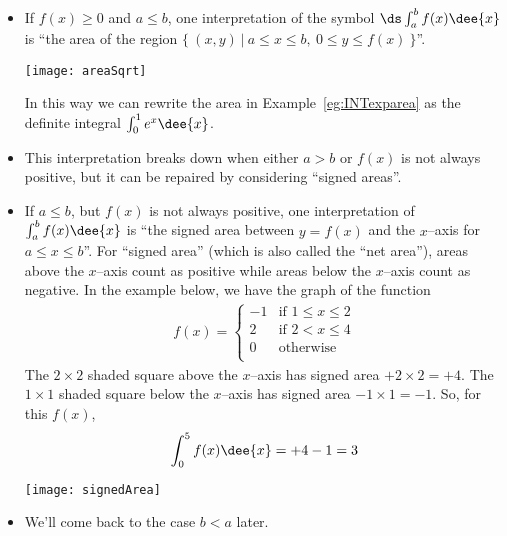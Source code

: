 \begin{itemize}
\item If $f(x)\ge 0$ and $a\le b$, one interpretation of the symbol
       $\ds \int_a^b f(x)\dee{x}$ is ``the area of the region $\big\{\ (x,y)\ \big|\
                                 a\le x\le b,\   0\le y\le f(x)\ \big\}$''.
      \begin{efig}
      \begin{center}
          \texttt{[image: areaSqrt]}
      \end{center}
      \end{efig}
In this way we can rewrite the area in Example~\ref{eg:INTexparea} as the definite
integral $\int_0^1 e^x \dee{x}$.

\item This interpretation breaks down when either $a>b$ or $f(x)$ is not always positive,
but it can be repaired by considering ``signed areas''.

\item If $a\le b$, but $f(x)$ is not always positive, one interpretation of $\int_a^b
f(x)\dee{x}$ is ``the signed area between $y=f(x)$ and the $x$--axis for $a\le x\le b$''.
For ``signed area'' (which is also called the ``net area''), areas above the $x$--axis
count as positive while areas below the $x$--axis count as negative. In the example
below,
we have the graph of the function
      \begin{align*}
           f(x)=\begin{cases}
                   -1 & \text{if }1\le x\le 2 \\
                   2  & \text{if }2< x\le 4 \\
                   0 & \text{otherwise} \\
                \end{cases}
      \end{align*}
      The $2\times 2$ shaded square above the $x$--axis has signed area
      $+2\times 2=+4$. The $1\times 1$ shaded square below the $x$--axis has signed area
      $-1\times 1=-1$. So, for this $f(x)$,
      \begin{align*}
           \int_0^5 f(x)\dee{x} = +4-1=3
      \end{align*}
      \begin{efig}
      \begin{center}
          \texttt{[image: signedArea]}
      \end{center}
      \end{efig}
\item We'll come back to the case $b<a$ later.
\end{itemize}
